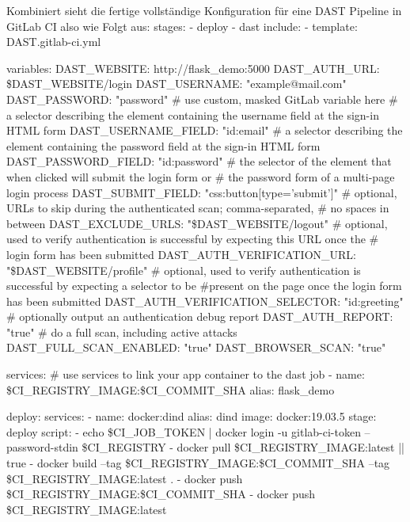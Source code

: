 Kombiniert sieht die fertige vollständige Konfiguration für eine DAST Pipeline in GitLab CI also wie Folgt aus:
stages:
  - deploy
  - dast
include:
  - template: DAST.gitlab-ci.yml

variables:
  DAST_WEBSITE: http://flask_demo:5000
  DAST_AUTH_URL: \$DAST_WEBSITE/login
  DAST_USERNAME: "example@mail.com"
  DAST_PASSWORD: "password" # use custom, masked GitLab variable here
  # a selector describing the element containing the username field at the sign-in HTML form
  DAST_USERNAME_FIELD: "id:email"
  # a selector describing the element containing the password field at the sign-in HTML form
  DAST_PASSWORD_FIELD: "id:password"
  # the selector of the element that when clicked will submit the login form or
  # the password form of a multi-page login process
  DAST_SUBMIT_FIELD: "css:button[type='submit']"
  # optional, URLs to skip during the authenticated scan; comma-separated,
  # no spaces in between
  DAST_EXCLUDE_URLS: "\$DAST_WEBSITE/logout"
  # optional, used to verify authentication is successful by expecting this URL once the
  # login form has been submitted
  DAST_AUTH_VERIFICATION_URL: "\$DAST_WEBSITE/profile"
  # optional, used to verify authentication is successful by expecting a selector to be
  #present on the page once the login form has been submitted
  DAST_AUTH_VERIFICATION_SELECTOR: "id:greeting"
  # optionally output an authentication debug report
  DAST_AUTH_REPORT: "true"
  # do a full scan, including active attacks
  DAST_FULL_SCAN_ENABLED: "true"
  DAST_BROWSER_SCAN: "true"

services: # use services to link your app container to the dast job
  - name: \$CI_REGISTRY_IMAGE:\$CI_COMMIT_SHA
    alias: flask_demo

deploy:
  services:
  - name: docker:dind
    alias: dind
  image: docker:19.03.5
  stage: deploy
  script:
    - echo \$CI_JOB_TOKEN | docker login -u gitlab-ci-token --password-stdin \$CI_REGISTRY
    - docker pull \$CI_REGISTRY_IMAGE:latest || true
    - docker build --tag \$CI_REGISTRY_IMAGE:\$CI_COMMIT_SHA --tag \$CI_REGISTRY_IMAGE:latest .
    - docker push \$CI_REGISTRY_IMAGE:\$CI_COMMIT_SHA
    - docker push \$CI_REGISTRY_IMAGE:latest

